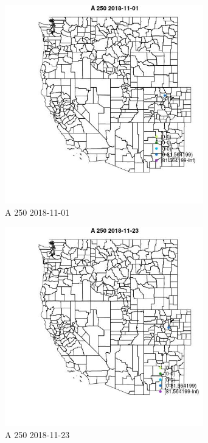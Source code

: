 \begin{figure} 
\centering  
\includegraphics[width=0.77\textwidth]{Code_Outputs/Report_ML_input_PM25_Step4_part_e_de_duplicated_aves_MapObsA_2502018-11-01.jpg} 
\caption{\label{fig:Report_ML_input_PM25_Step4_part_e_de_duplicated_avesMapObsA_2502018-11-01}A 250 2018-11-01} 
\end{figure} 
 

\clearpage 

\begin{figure} 
\centering  
\includegraphics[width=0.77\textwidth]{Code_Outputs/Report_ML_input_PM25_Step4_part_e_de_duplicated_aves_MapObsA_2502018-11-23.jpg} 
\caption{\label{fig:Report_ML_input_PM25_Step4_part_e_de_duplicated_avesMapObsA_2502018-11-23}A 250 2018-11-23} 
\end{figure} 
 

